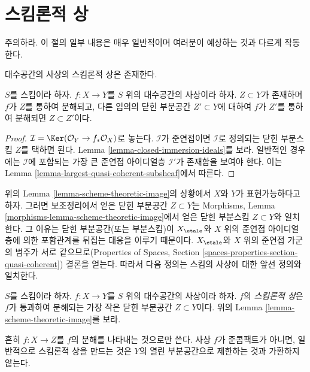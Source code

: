 \section{스킴론적 상}
\label{section-scheme-theoretic-image}

\noindent
주의하라. 이 절의 일부 내용은 매우 일반적이며 여러분이 예상하는
것과 다르게 작동한다.

\begin{lemma}
\label{lemma-scheme-theoretic-image}
\begin{slogan}
대수공간의 사상의 스킴론적 상은 존재한다.
\end{slogan}
$S$를 스킴이라 하자. $f : X \to Y$를 $S$ 위의 대수공간의
사상이라 하자. $Z \subset Y$가 존재하며 $f$가 $Z$를 통하여
분해되고, 다른 임의의 닫힌 부분공간 $Z' \subset Y$에 대하여
$f$가 $Z'$를 통하여 분해되면 $Z \subset Z'$이다.
\end{lemma}

\begin{proof}
$\mathcal{I} = \Ker(\mathcal{O}_Y \to f_*\mathcal{O}_X)$로 놓는다.
$\mathcal{I}$가 준연접이면 $\mathcal{I}$로 정의되는 닫힌 부분스킴
$Z$를 택하면 된다. Lemma \ref{lemma-closed-immersion-ideals}를 보라.
일반적인 경우에는 $\mathcal{I}$에 포함되는 가장 큰 준연접
아이디얼층 $\mathcal{I}'$가 존재함을 보여야 한다.
이는 Lemma \ref{lemma-largest-quasi-coherent-subsheaf}에서 따른다.
\end{proof}

\noindent
위의 Lemma \ref{lemma-scheme-theoretic-image}의 상황에서 $X$와
$Y$가 표현가능하다고 하자. 그러면 보조정리에서 얻은 닫힌
부분공간 $Z \subset Y$는 Morphisms, Lemma
\ref{morphisms-lemma-scheme-theoretic-image}에서 얻은 닫힌
부분스킴 $Z \subset Y$와 일치한다.
그 이유는 닫힌 부분공간(또는 부분스킴)이
$X_\etale$와 $X$ 위의 준연접 아이디얼층에 의한 포함관계를 뒤집는
대응을 이루기 때문이다. $X_\etale$와 $X$ 위의 준연접 가군의
범주가 서로 같으므로(Properties of Spaces, Section
\ref{spaces-properties-section-quasi-coherent}) 결론을 얻는다.
따라서 다음 정의는 스킴의 사상에 대한 앞선 정의와 일치한다.

\begin{definition}
\label{definition-scheme-theoretic-image}
$S$를 스킴이라 하자. $f : X \to Y$를 $S$ 위의 대수공간의
사상이라 하자. $f$의 {\it 스킴론적 상}은 $f$가 통과하여
분해되는 가장 작은 닫힌 부분공간 $Z \subset Y$이다.
위의 Lemma \ref{lemma-scheme-theoretic-image}를 보라.
\end{definition}

\noindent
흔히 $f : X \to Z$를 $f$의 분해를 나타내는 것으로만 쓴다.
사상 $f$가 준콤팩트가 아니면, 일반적으로 스킴론적 상을 만드는
것은 $Y$의 열린 부분공간으로 제한하는 것과 가환하지 않는다.

